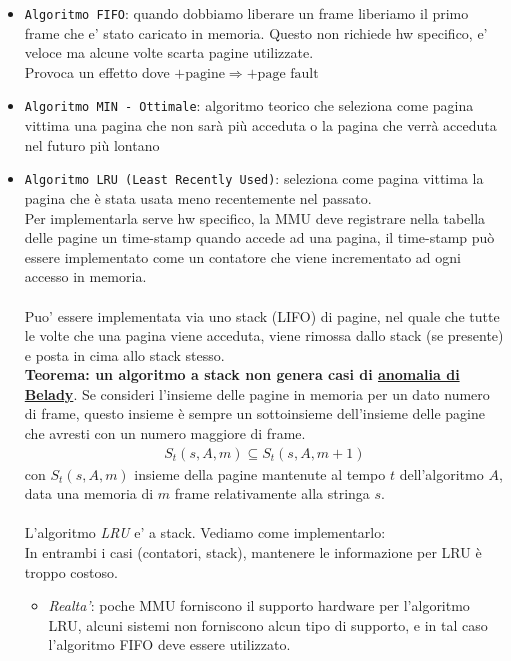 \documentclass[a4paper,12pt]{article}
\begin{document}
\begin{itemize}
  \item \texttt{Algoritmo FIFO}: quando dobbiamo liberare un frame liberiamo il primo frame che e' stato caricato in memoria. Questo non richiede hw specifico, e' veloce ma alcune volte scarta pagine utilizzate. \\
  Provoca un effetto dove $+\text{pagine} \Rightarrow +\text{page fault}$
  \item \texttt{Algoritmo MIN - Ottimale}: algoritmo teorico che seleziona come pagina vittima una pagina che non sarà più acceduta o la pagina che verrà acceduta nel futuro più lontano
  \item \texttt{Algoritmo LRU (Least Recently Used)}: seleziona come pagina vittima la pagina che è stata usata meno recentemente nel passato.\\
  Per implementarla serve hw specifico, la MMU deve registrare nella tabella delle pagine un time-stamp quando accede ad una pagina, il time-stamp può essere implementato come un contatore che viene incrementato ad ogni accesso in memoria.\\
  \vspace{1px}\\
  Puo' essere implementata via uno stack (LIFO) di pagine, nel quale che tutte le volte che una pagina viene acceduta, viene rimossa dallo stack (se presente) e posta in cima allo stack stesso.
  \vspace{1px}\\
  \textbf{Teorema: un algoritmo a stack non genera casi di \hyperref[Belady]{anomalia di Belady}}. Se consideri l’insieme delle pagine in memoria per un dato numero di frame, questo insieme è sempre un sottoinsieme dell’insieme delle pagine che avresti con un numero maggiore di frame.
  \begin{align*}
    S_t(s,A,m) \subseteq S_t(s,A,m+1)
  \end{align*}
  con $S_t(s,A,m)$ insieme della pagine mantenute al tempo $t$ dell'algoritmo $A$, data una memoria di $m$ frame relativamente alla stringa $s$.\\
  \vspace{2px}\\
  L'algoritmo \textit{LRU} e' a stack. Vediamo come implementarlo:\\
  In entrambi i casi (contatori, stack), mantenere le informazione per LRU è troppo costoso.\\
  \begin{itemize}
    \item \textit{Realta'}: poche MMU forniscono il supporto hardware per l'algoritmo LRU, alcuni sistemi non forniscono alcun tipo di supporto, e in tal caso l'algoritmo FIFO deve essere utilizzato.

\end{itemize}
\end{itemize}
\end{document}
